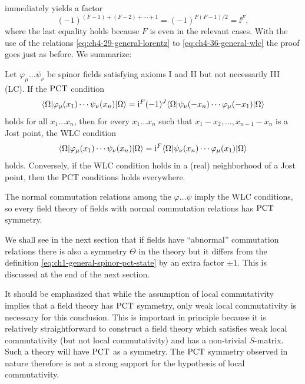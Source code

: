 immediately yields a factor
\[
  (-1)^{(F-1)+(F-2)+\cdots+1}=(-1)^{F(F-1)/2}=\ii^F,
\]
where the last equality holds because $F$ is even in the relevant cases.
With the use of the relations \eqref{eq:ch4-29-general-lorentz} to \eqref{eq:ch4-36-general-wlc} the proof goes just as
before.  We summarize:

\begin{theorem}
\label{thm:ch4-7-general-spin-pct}

Let $\varphi_\mu\ldots\psi_\nu$ be spinor fields satisfying axioms I and II but
not necessarily III (LC).  If the $\mathrm{PCT}$ condition
\begin{equation*}
  \langle \Omega\rvert\varphi_\mu(x_1)\cdots\psi_\nu(x_n)\lvert \Omega\rangle
  =\mathrm{i}^F(-1)^J
  \langle \Omega\rvert\psi_\nu(-x_n)\cdots\varphi_\mu(-x_1)\lvert \Omega\rangle
\end{equation*}
holds for all $x_1\ldots x_n$, then for every $x_1\ldots x_n$ such that
$x_1-x_2,\ldots,x_{n-1}-x_n$ is a Jost point, the WLC condition
\begin{equation*}
  \langle \Omega\rvert\varphi_\mu(x_1)\cdots\psi_\nu(x_n)\lvert \Omega\rangle
  =\mathrm{i}^F
  \langle \Omega\rvert\psi_\nu(x_n)\cdots\varphi_\mu(x_1)\lvert \Omega\rangle
\end{equation*}
holds.  Conversely, if the WLC condition holds in a (real) neighborhood of a
Jost point, then the PCT conditions holds everywhere.

The normal commutation relations among the $\varphi\ldots\psi$ imply the WLC
conditions, so every field theory of fields with normal commutation relations
has $\mathrm{PCT}$ symmetry.
\end{theorem}

We shall see in the next section that if fields have “abnormal” commutation
relations there is also a symmetry $\Theta$ in the theory but it differs from
the definition \eqref{eq:ch1-general-spinor-pct-state} by an extra factor $\pm1$.  This is discussed at the end
of the next section.

It should be emphasized that while the assumption of local commutativity
implies that a field theory has $\mathrm{PCT}$ symmetry, only weak local commutativity
is necessary for this conclusion.  This is important in principle because it
is relatively straightforward to construct a field theory which satisfies weak
local commutativity (but not local commutativity) and has a non-trivial
$S$-matrix.  Such a theory will have $\mathrm{PCT}$ as a symmetry.  The $\mathrm{PCT}$ symmetry
observed in nature therefore is not a strong support for the hypothesis of
local commutativity.

